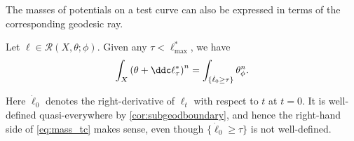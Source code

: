The masses of potentials on a test curve can also be expressed in terms of the corresponding geodesic ray.
\begin{proposition}[Hisamoto]\label{prop:His_mass_tc}
        Let $\ell\in \mathcal{R}(X,\theta;\phi)$. Given any $\tau<\ell^*_{\max}$, we have
    \begin{equation}\label{eq:mass_tc}
    \int_X \left(\theta+\ddc \ell^*_{\tau}\right)^n=\int_{\{\dot{\ell}_0\geq \tau\}} \theta_{\phi}^n.
    \end{equation}
\end{proposition}
Here $\dot{\ell}_0$ denotes the right-derivative of $\ell_t$ with respect to $t$ at $t=0$. It is well-defined quasi-everywhere by \cref{cor:subgeodboundary}, and hence the right-hand side of \eqref{eq:mass_tc} makes sense, even though $\{\dot{\ell}_0\geq \tau\}$ is not well-defined.

